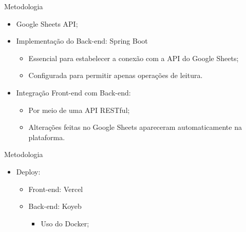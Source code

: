 \begin{frame}{Metodologia}
    \begin{itemize}
        \item Google Sheets API; \vspace{0.25cm}
        \item Implementação do Back-end: Spring Boot \vspace{0.25cm}
              \begin{itemize}
                  \item Essencial para estabelecer a conexão com a API do Google Sheets; \vspace{0.25cm}
                  \item Configurada para permitir apenas operações de leitura. \vspace{0.25cm}
              \end{itemize}
        \item Integração Front-end com Back-end: \vspace{0.25cm}
              \begin{itemize}
                  \item Por meio de uma API RESTful; \vspace{0.25cm}
                  \item Alterações feitas no Google Sheets apareceram automaticamente na plataforma. \vspace{0.25cm}
              \end{itemize}
    \end{itemize}
\end{frame}

\begin{frame}{Metodologia}
    \begin{itemize}
        \item Deploy: \vspace{0.5cm}
              \begin{itemize}
                  \item Front-end: Vercel \vspace{0.5cm}
                  \item Back-end: Koyeb \vspace{0.5cm}
                        \begin{itemize}
                            \item Uso do Docker; \vspace{0.25cm}
                        \end{itemize}
              \end{itemize}
    \end{itemize}
\end{frame}

